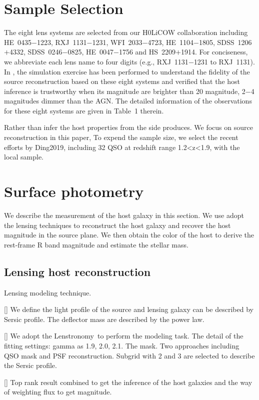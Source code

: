 \documentclass[fleqn,usenatbib]{mnras}
\newcommand{\lenstronomy}{{\sc Lenstronomy}}
\begin{document}
\section{Sample Selection}
The eight lens systems are selected from our H0LiCOW collaboration including HE~0435$-$1223, RXJ~1131$-$1231, WFI~2033$-$4723, HE~1104$-$1805, SDSS~1206$+$4332, SDSS~0246$-$0825, HE~0047$-$1756 and HS~2209$+$1914. For conciseness, we abbreviate each lens name to four digits (e.g., RXJ~1131$-$1231 to RXJ~1131). In \citet{Ding2017a}, the simulation exercise has been performed to understand the fidelity of the source reconstruction based on these eight systems and verified that the host inference is trustworthy when its magnitude are brighter than 20 magnitude, 2$-$4 magnitudes dimmer than the AGN. The detailed information of the observations for these eight systems are given in Table~1 therein.



Rather than infer the host properties from the side produces. 
We focus on source reconstruction in this paper, 
To expend the sample size, we select the recent efforts by Ding2019, including 32 QSO at redshift  range 1.2<z<1.9, with the local sample.

\section{Surface photometry}
We describe the measurement of the host galaxy in this section. We use adopt the lensing techniques to reconstruct the host galaxy and recover the host magnitude in the source plane. We then obtain the color of the host to derive the rest-frame R band magnitude and estimate the stellar mass.

\subsection{Lensing host reconstruction}
Lensing modeling technique.

[] We define the light profile of the source and lensing galaxy can be described by Sersic profile. The deflector mass are described by the power law.

[] We adopt the \lenstronomy~to perform the modeling task. The detail of the fitting settings: gamma as 1.9, 2.0, 2.1. The mask. Two approaches including QSO mask and PSF reconstruction. Subgrid with 2 and 3 are selected to describe the Sersic profile.

[] Top rank result combined to get the inference of the host galaxies and the way of weighting flux to get magnitude.
\end{document}
